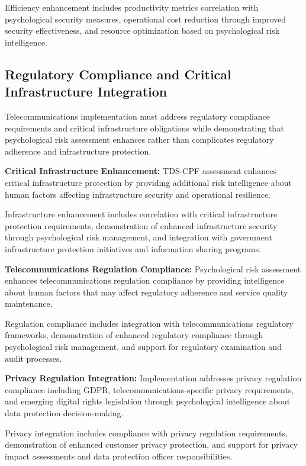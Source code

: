 \documentclass[10pt, twocolumn]{article}
\begin{document}
Efficiency enhancement includes productivity metrics correlation with psychological security measures, operational cost reduction through improved security effectiveness, and resource optimization based on psychological risk intelligence.

\subsection{Regulatory Compliance and Critical Infrastructure Integration}

Telecommunications implementation must address regulatory compliance requirements and critical infrastructure obligations while demonstrating that psychological risk assessment enhances rather than complicates regulatory adherence and infrastructure protection.

\textbf{Critical Infrastructure Enhancement:} TDS-CPF assessment enhances critical infrastructure protection by providing additional risk intelligence about human factors affecting infrastructure security and operational resilience.

Infrastructure enhancement includes correlation with critical infrastructure protection requirements, demonstration of enhanced infrastructure security through psychological risk management, and integration with government infrastructure protection initiatives and information sharing programs.

\textbf{Telecommunications Regulation Compliance:} Psychological risk assessment enhances telecommunications regulation compliance by providing intelligence about human factors that may affect regulatory adherence and service quality maintenance.

Regulation compliance includes integration with telecommunications regulatory frameworks, demonstration of enhanced regulatory compliance through psychological risk management, and support for regulatory examination and audit processes.

\textbf{Privacy Regulation Integration:} Implementation addresses privacy regulation compliance including GDPR, telecommunications-specific privacy requirements, and emerging digital rights legislation through psychological intelligence about data protection decision-making.

Privacy integration includes compliance with privacy regulation requirements, demonstration of enhanced customer privacy protection, and support for privacy impact assessments and data protection officer responsibilities.
\end{document}
